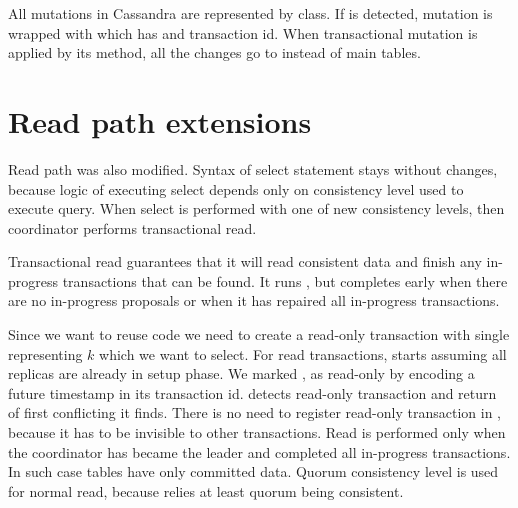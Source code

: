 All mutations in Cassandra are represented by  class. If \transaction is detected, mutation is wrapped with  which has  and transaction id.
When transactional mutation is applied by its  method, all the changes go to \txStorage instead of main tables.

\section{Read path extensions}
Read path \cite{CassandraReadPath} was also modified. 
Syntax of select statement stays without changes, because logic of executing select depends only on consistency level used to execute query. When select is performed with one of new consistency levels, then coordinator performs transactional read.


Transactional read guarantees that it will read consistent data and finish any in-progress transactions that can be found. It runs \mpt, but completes early when there are no in-progress proposals or when it has repaired all in-progress transactions.


Since we want to reuse \mpt code we need to create a read-only transaction with single \txItem representing $k$ which we want to select. For read transactions, \mpt starts assuming all replicas are already in setup phase. 
We marked \txState, as read-only \txState by encoding a future timestamp in its transaction id.
\txIndex detects read-only transaction and return \paxosRoundId of first conflicting \txState it finds. There is no need to register read-only transaction in \txIndex, because it has to be invisible to other transactions.
Read is performed only when the coordinator has became the leader and completed all in-progress transactions. In such case tables have only committed data. Quorum consistency level is used for normal read, because \mpt relies at least quorum being consistent.



